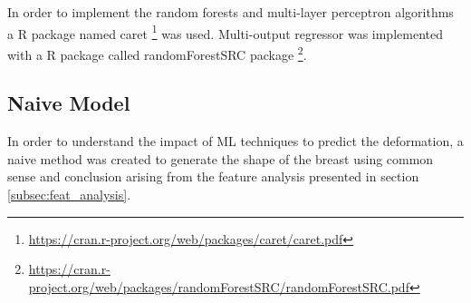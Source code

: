In order to implement the random forests and multi-layer perceptron algorithms a R package named caret \footnote{\label{caret} \url{https://cran.r-project.org/web/packages/caret/caret.pdf}} was used. Multi-output regressor was implemented with a R package called randomForestSRC package \footnote{\label{rfsrc} \url{https://cran.r-project.org/web/packages/randomForestSRC/randomForestSRC.pdf}}.

\subsection{Naive Model} \label{sub_sec:naive_method_explanation}

In order to understand the impact of ML techniques to predict the deformation, a naive method was created to generate the shape of the breast using common sense and conclusion arising from the feature analysis presented in section \ref{subsec:feat_analysis}.

